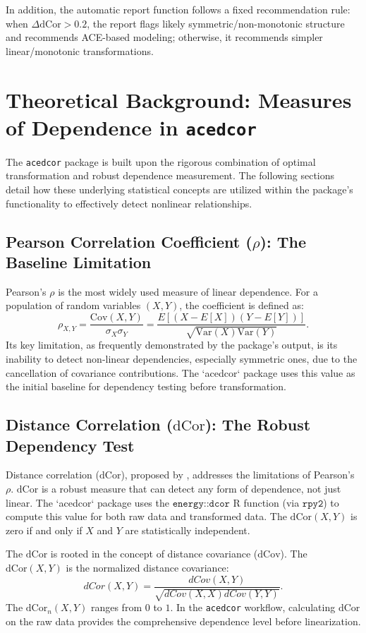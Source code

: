 \documentclass[a4paper,fleqn]{cas-sc}
\newcommand{\dCor}{\mathrm{dCor}}
\newcommand{\dCov}{\mathrm{dCov}}
\begin{document}
In addition, the automatic report function follows a fixed recommendation rule: when $\Delta\dCor > 0.2$, the report flags likely symmetric/non-monotonic structure and recommends ACE-based modeling; otherwise, it recommends simpler linear/monotonic transformations.


\section{Theoretical Background: Measures of Dependence in \texttt{acedcor}}
\label{sec:theory}
The \texttt{acedcor} package is built upon the rigorous combination of optimal transformation and robust dependence measurement. The following sections detail how these underlying statistical concepts are utilized within the package's functionality to effectively detect nonlinear relationships.

\subsection{Pearson Correlation Coefficient ($\rho$): The Baseline Limitation}
Pearson's $\rho$ is the most widely used measure of linear dependence. For a population of random variables $(X, Y)$, the coefficient is defined as:
$$\rho_{X,Y}=\frac{\mathrm{Cov}(X,Y)}{\sigma_{X}\sigma_{Y}}=\frac{E[(X-E[X])(Y-E[Y])]}{\sqrt{\mathrm{Var}(X)\mathrm{Var}(Y)}}.$$
Its key limitation, as frequently demonstrated by the package's output, is its inability to detect non-linear dependencies, especially symmetric ones, due to the cancellation of covariance contributions. The `acedcor` package uses this value as the initial baseline for dependency testing before transformation.

\subsection{Distance Correlation ($\dCor$): The Robust Dependency Test}
Distance correlation ($\dCor$), proposed by \cite{Szekely2007}, addresses the limitations of Pearson's $\rho$. $\dCor$ is a robust measure that can detect any form of dependence, not just linear. The `acedcor` package uses the $\texttt{energy::dcor}$ R function (via $\texttt{rpy2}$) to compute this value for both raw data and transformed data. The $\dCor(X,Y)$ is zero if and only if $X$ and $Y$ are statistically independent.

The $\dCor$ is rooted in the concept of distance covariance ($\dCov$). The $\dCor(X,Y)$ is the normalized distance covariance:
$$dCor(X,Y)=\frac{dCov(X,Y)}{\sqrt{dCov(X,X)dCov(Y,Y)}}.$$
The $\dCor_{n}(X,Y)$ ranges from $0$ to $1$. In the \texttt{acedcor} workflow, calculating $\dCor$ on the raw data provides the comprehensive dependence level before linearization.
\end{document}
